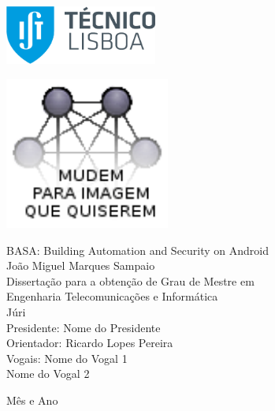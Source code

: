 \thispagestyle {empty}

\includegraphics[width=5.0cm]{Logo.png}

\begin{center}
%
\vspace{0.3cm}
\hspace{-0.5cm}\includegraphics[height=50mm]{Figures/frontImage.png}

\vspace{0.8cm}
{\FontLb BASA: Building Automation and Security on Android} \\
\vspace{2.6cm}
{\FontMb João Miguel Marques Sampaio} \\
\vspace{1.9cm}
{\FontLn Disserta\c{c}\~{a}o para a obten\c{c}\~{a}o de Grau de Mestre em} \\
\vspace{0.3cm}
{\FontLb Engenharia Telecomunicações e Informática} \\
\vspace{1.9cm}
{\FontMb J\'{u}ri} \\
\vspace{0.3cm}
{\FontSn %
Presidente:        Nome do Presidente \\
Orientador:        Ricardo Lopes Pereira \\
Vogais:            Nome do Vogal 1 \\
                   Nome do Vogal 2 \\
}
\vspace{1.5cm}

{\FontMb M\^{e}s e Ano} \\
%
\end{center}

\cleardoublepage

\restoregeometry
